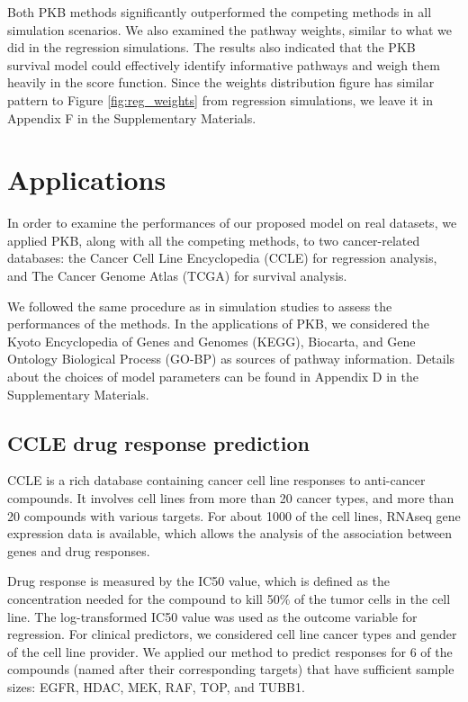 \documentclass[a4paper,12pt]{article}
\begin{document}
Both PKB methods significantly outperformed the competing methods in all  simulation scenarios. We also examined the pathway weights, similar to what we did in the regression simulations. The results also indicated that the PKB survival model could effectively identify informative pathways and weigh them heavily in the score function. Since the weights distribution figure has similar pattern to Figure \ref{fig:reg_weights} from regression simulations, we leave it in Appendix F in the Supplementary Materials.

\section{Applications}\label{results}
In order to examine the performances of our proposed model on real datasets, we applied PKB, along with all the competing methods, to two cancer-related databases: the Cancer Cell Line Encyclopedia (CCLE) \citep{barretina2012cancer} for regression analysis, and The Cancer Genome Atlas (TCGA) for survival analysis. 

We followed the same procedure as in simulation studies to assess the performances of the methods. In the applications of PKB, we considered the Kyoto Encyclopedia of Genes and Genomes (KEGG), \citep{kanehisa2000kegg} Biocarta, \citep{nishimura2001biocarta} and Gene Ontology Biological Process (GO-BP) \citep{ashburner2000gene, gene2016expansion} as sources of pathway information. Details about the choices of model parameters can be found in Appendix D in the Supplementary Materials.

\subsection{CCLE drug response prediction}

CCLE is a rich database containing cancer cell line responses to anti-cancer compounds. It involves cell lines from more than 20 cancer types, and more than 20 compounds with various targets. For about 1000 of the cell lines, RNAseq gene expression data is available, which allows the analysis of the association between genes and drug responses. 

Drug response is measured by the IC50 value, which is defined as the concentration needed for the compound to kill 50$\%$ of the tumor cells in the cell line. The log-transformed IC50 value was used as the outcome variable for regression. For clinical predictors, we considered cell line cancer types and gender of the cell line provider. We applied our method to predict responses for 6 of the compounds (named after their corresponding targets) that have sufficient sample sizes: EGFR, HDAC, MEK, RAF, TOP, and TUBB1. 
\end{document}
